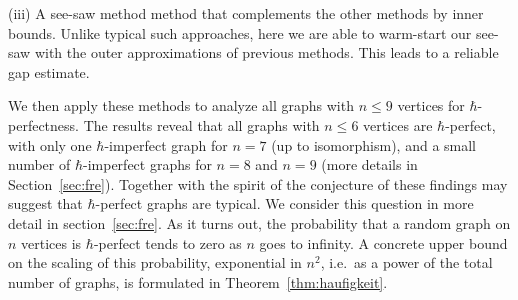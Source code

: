 \documentclass[
12pt,
prx,
aps,
reprint,
a4paper,
longbibliograph,
nofootinbib,
nobibnotes,
superscriptaddress
]{revtex4-2}
\theoremstyle{definition}
\begin{document}
(iii) A see-saw method method that complements the other methods by inner bounds. Unlike typical such approaches, here we are able to warm-start our see-saw with the outer approximations of previous methods. This leads to a reliable gap estimate. 

We then apply these methods to analyze all graphs with $n \leq 9$ vertices for $\hbar$-perfectness. The results reveal that all graphs with $n \leq 6$ vertices are $\hbar$-perfect, with only one $\hbar$-imperfect graph for $n = 7$ (up to isomorphism), and a small number of $\hbar$-imperfect graphs for $n = 8$ and $n = 9$ (more details in Section~\ref{sec:fre}).
Together with the spirit of the conjecture of \cite{de2023uncertainty} these findings may suggest that $\hbar$-perfect graphs are typical. We consider this question in more detail in  section~\ref{sec:fre}. As it turns out, the probability that a random graph on $n$ vertices is $\hbar$-perfect tends to zero as $n$ goes to infinity. A concrete upper bound on the scaling of this probability, exponential in $n^2$, i.e.~as a power of the total number of graphs, is formulated in Theorem~\ref{thm:haufigkeit}. 
\end{document}
